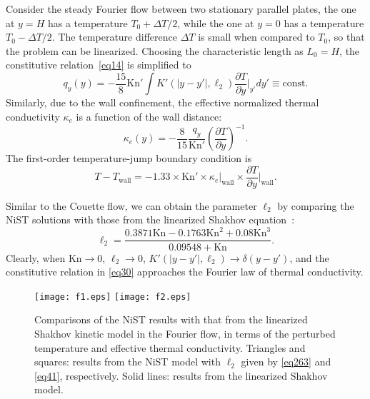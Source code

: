 \documentclass[lineno]{jfm}
\begin{document}
Consider the steady Fourier flow between two stationary parallel plates, the one at $y=H$ has a temperature $T_0+\Delta T/2$, while the one at $y=0$ has a temperature $T_0-\Delta T/2$. The temperature difference $\Delta T$ is small when compared to $T_0$, so that the problem can be linearized. Choosing the characteristic length as $L_0=H$, the constitutive relation~\eqref{eq14} is simplified to 
\begin{equation}\label{eq30}
	q_{y}(y) = - \frac{15}{8} \text{Kn}' \int K'(| y - y'|,\ell_2) \frac{\partial T}{\partial y}\bigg|_{y'}  d y' \equiv \text{const}.
\end{equation}
Similarly, due to the wall confinement, the effective normalized thermal conductivity $\kappa_e$ is a function of the wall distance:
\begin{equation}\label{eq243}
	{\kappa}_{e}(y) =- \frac{8}{15} \frac{{q}_y}{\text{Kn}'} \left(\frac{\partial {T}}{\partial {y}}\right)^{-1}.
\end{equation}
The first-order temperature-jump boundary condition is
\begin{equation}\label{eq30.5}
	T-T_{\text{wall}} = -1.33 \times \text{Kn}' \times \kappa_{e} \bigg|_\text{wall} \times \frac{\partial T}{\partial y}\bigg|_\text{wall}.
\end{equation}


Similar to the Couette flow, we can obtain the parameter $\ell_2$ by comparing the NiST solutions with those from the linearized Shakhov equation~\citep{Lei2022}:
\begin{equation}\label{eq263}
\ell_2 = \frac{0.3871 \text{Kn} - 0.1763 \text{Kn}^2+0.08 \text{Kn}^3 }{0.09548+\text{Kn}}.
\end{equation}
Clearly, when $\text{Kn}\rightarrow0$, $\ell_2\rightarrow0$, $K'(|y - y'|,\ell_2)\rightarrow\delta(y-y')$, and the constitutive relation in \eqref{eq30} approaches the Fourier law of thermal conductivity. 

\begin{figure}
	\centering
	{\texttt{[image: f1.eps]}} 
	{\texttt{[image: f2.eps]}} 
	\caption{Comparisons of the NiST results with that from the linearized Shakhov kinetic model in the Fourier flow, in terms of the perturbed temperature and effective thermal conductivity. Triangles and squares: results from the NiST model with $\ell_2$ given by \eqref{eq263} and \eqref{eq41}, respectively. Solid lines: results from the linearized Shakhov model.
	}
	\label{resultf}
\end{figure}
\end{document}
